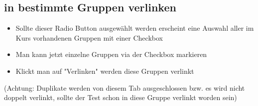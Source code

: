 \subsection*{in bestimmte Gruppen verlinken}
\begin{itemize}
	\item Sollte dieser Radio Button ausgewählt werden erscheint eine Auswahl aller im Kurs vorhandenen Gruppen mit einer Checkbox
	\item Man kann jetzt einzelne Gruppen via der Checkbox markieren
	\item Klickt man auf "Verlinken" werden diese Gruppen verlinkt
\end{itemize}

(Achtung: Duplikate werden von diesem Tab ausgeschlossen bzw. es wird nicht doppelt verlinkt, sollte der Test schon in diese Gruppe verlinkt worden sein) 
\clearpage